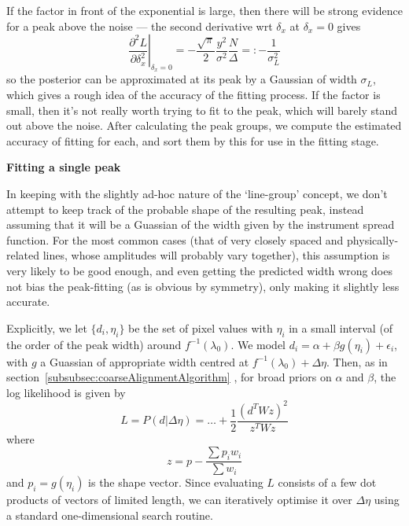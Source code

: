 If the factor in front of the exponential is large, then there will be strong
evidence for a peak above the noise --- the second derivative wrt $\delta_x$ at
$\delta_x = 0$ gives
\[
\left.\frac{\partial^2 L}{\partial \delta_x^2} \right|_{\delta_x = 0} = - \frac{\sqrt \pi}{2} \frac{y^2}{\sigma^2}\frac{N}{\Delta} =: - \frac{1}{\sigma_L^2}
\] 
so the posterior can be approximated at its peak by a Gaussian of width
$\sigma_L$, which gives a rough idea of the accuracy of the fitting
process. If the factor is small, then it's not really worth trying to
fit to the peak, which will barely stand out above the noise. After
calculating the peak groups, we compute the estimated accuracy of
fitting for each, and sort them by this for use in the fitting stage.



\vspace{1em}


{\bf{Fitting a single peak}}

\vspace{1em}

In keeping with the slightly ad-hoc nature of the `line-group' concept,
we don't attempt to keep track of the probable shape of the resulting
peak, instead assuming that it will be a Guassian of the width given
by the instrument spread function. For the most common cases (that of
very closely spaced and physically-related lines, whose amplitudes will
probably vary together), this assumption is very likely to be good
enough, and even getting the predicted width wrong does not bias the
peak-fitting (as is obvious by symmetry), only making it slightly less
accurate.

Explicitly, we let $\{d_i, \eta_i\}$ be the set of pixel values
with $\eta_i$ in a small interval (of the order of the peak
width) around $f^{-1}(\lambda_0)$. We model $d_i = \alpha + \beta
g(\eta_i) + \epsilon_i$, with $g$ a Guassian of appropriate
width centred at $f^{-1}(\lambda_0) + \Delta\eta$. Then, as in
section~\ref{subsubsec:coarseAlignmentAlgorithm} , for broad priors on
$\alpha$ and $\beta$, the log likelihood is given by
\[
L = P(d|\Delta\eta) = \dots + \frac{1}{2} \frac{(d^T W z)^2}{z^T W z}
\]
where
\[
z = p - \frac{\sum p_i w_i}{\sum w_i}
\]
and $p_i = g(\eta_i)$ is the shape vector. Since evaluating $L$ consists
of a few dot products of vectors of limited length, we can iteratively
optimise it over $\Delta\eta$ using a standard one-dimensional search
routine.

